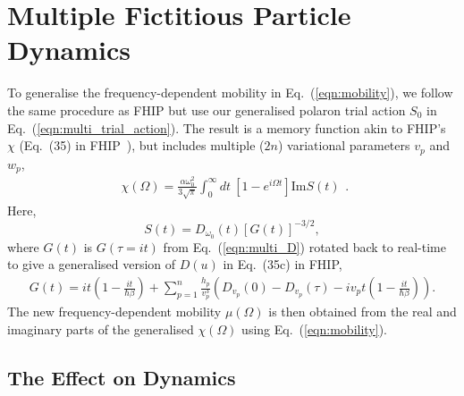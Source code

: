 \section{Multiple Fictitious Particle Dynamics}

To generalise the frequency-dependent mobility in Eq.~(\ref{eqn:mobility}), we follow the same procedure as FHIP but use our generalised polaron trial action $S_0$ in Eq.~(\ref{eqn:multi_trial_action}). The result is a memory function akin to FHIP's $\chi$ (Eq.~(35) in FHIP~\cite{feynman_mobility_1962}), but includes multiple ($2n$) variational parameters $v_{p}$ and $w_{p}$,
\begin{equation}\label{eqn:multichi}
    \begin{gathered}
        \chi(\Omega) = \frac{\alpha \omega_0^{2}}{3\sqrt{\pi}} \int_0^{\infty} dt\ \left[1 - e^{i\Omega t}\right] \textrm{Im} S(t)
    \end{gathered} .
\end{equation}
Here, 
\begin{equation}
    S(t) = D_{\omega_0}(t) [G(t)]^{-3/2} ,
\end{equation}
where $G(t)$ is $G(\tau = i t)$ from Eq.~(\ref{eqn:multi_D}) rotated back to real-time to give a generalised version of $D(u)$ in Eq.~(35c) in FHIP,
\begin{equation}
    \begin{gathered}
         G(t) = i t  \left(1 - \frac{i t}{\hbar\beta}\right) + \sum_{p=1}^n \frac{h_p}{v_p^3} \left(D_{v_p}(0) - D_{v_p}(\tau) - iv_p t\left(1 - \frac{it}{\hbar\beta} \right) \right).
    \end{gathered}
\end{equation}
The new frequency-dependent mobility $\mu(\Omega)$ is then obtained from the real and imaginary parts of the generalised $\chi(\Omega)$ using Eq.~(\ref{eqn:mobility}).

\subsection{The Effect on Dynamics}

